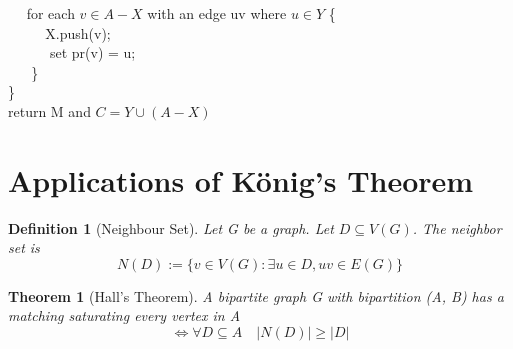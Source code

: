 \documentclass[11pt, oneside]{book}
\theoremstyle{break}
\newtheorem{thm}{Theorem}[section]
\newtheorem{defn}{Definition}[section]
\begin{document}
	$\quad$ for each $v \in A - X$ with an edge uv where $u \in Y$ \{\\
		$\text{ }\quad \quad$X.push(v); \\
		$\text{ }\quad \quad$ set pr(v) = u; \\
	$\text{ }\quad$\}\\
\}\\
$ $\\
return M and $C = Y \cup (A - X)$

\section{Applications of König's Theorem}

\begin{defn}[Neighbour Set]
	Let G be a graph. Let $D \subseteq V(G)$. The neighbor set is
	\[
		N(D) := \{v \in V(G) : \exists u \in D, uv \in E(G)\}
	\]
\end{defn}

\begin{thm}[Hall's Theorem]
	A bipartite graph G with bipartition (A, B) has a matching saturating every vertex in A
	\[
		\iff \forall D \subseteq A \quad |N(D)| \geq |D|
	\]
\end{thm}
\end{document}
